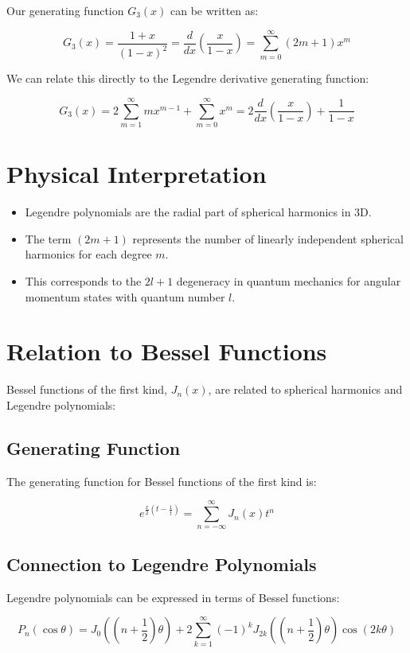\documentclass{article}
\begin{document}
Our generating function $G_3(x)$ can be written as:

\[G_3(x) = \frac{1+x}{(1-x)^2} = \frac{d}{dx}\left(\frac{x}{1-x}\right) = \sum_{m=0}^{\infty} (2m+1)x^m\]

We can relate this directly to the Legendre derivative generating function:

\[G_3(x) = 2\sum_{m=1}^{\infty} mx^{m-1} + \sum_{m=0}^{\infty} x^m = 2\frac{d}{dx}\left(\frac{x}{1-x}\right) + \frac{1}{1-x}\]

\section{Physical Interpretation}

\begin{itemize}
    \item Legendre polynomials are the radial part of spherical harmonics in 3D.
    \item The term $(2m+1)$ represents the number of linearly independent spherical harmonics for each degree $m$.
    \item This corresponds to the $2l+1$ degeneracy in quantum mechanics for angular momentum states with quantum number $l$.
\end{itemize}

\section{Relation to Bessel Functions}

Bessel functions of the first kind, $J_n(x)$, are related to spherical harmonics and Legendre polynomials:

\subsection{Generating Function}

The generating function for Bessel functions of the first kind is:

\[e^{\frac{x}{2}(t-\frac{1}{t})} = \sum_{n=-\infty}^{\infty} J_n(x)t^n\]

\subsection{Connection to Legendre Polynomials}

Legendre polynomials can be expressed in terms of Bessel functions:

\[P_n(\cos\theta) = J_0\left((n+\frac{1}{2})\theta\right) + 2\sum_{k=1}^{\infty} (-1)^k J_{2k}\left((n+\frac{1}{2})\theta\right) \cos(2k\theta)\]
\end{document}
